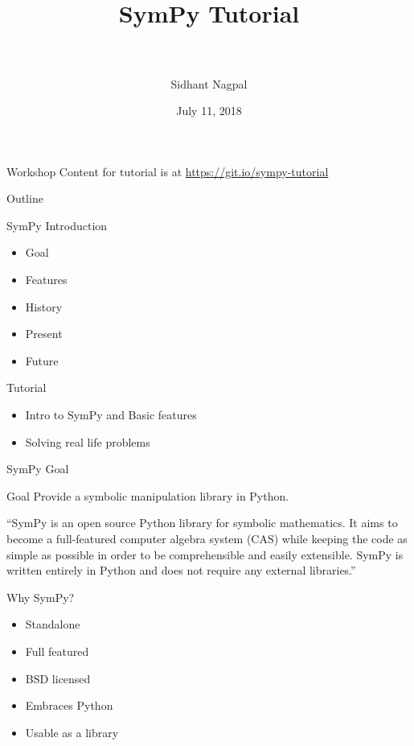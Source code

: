 \documentclass[xcolor=svgnames]{beamer}
\title[SymPy\hspace{4em}\insertframenumber/
\inserttotalframenumber]{~\\ SymPy Tutorial \\~}
\author[Sidhant Nagpal]
{Sidhant Nagpal}
\institute{\pgfuseimage{mylogo}}
\date{July 11, 2018}
\begin{document}
\begin{frame}
  \maketitle
\begin{center}
\normalsize Workshop Content for tutorial is at \url{https://git.io/sympy-tutorial}
\end{center}
\end{frame}

\begin{frame}{Outline}
  \begin{block}{SymPy Introduction}
    \begin{itemize}
    \item Goal
    \item Features
    \item History
    \item Present
    \item Future
    \end{itemize}
  \end{block}

  \begin{block}{Tutorial}
    \begin{itemize}
    \item Intro to SymPy and Basic features
    \item Solving real life problems
    \end{itemize}
  \end{block}
\end{frame}

\begin{frame}{SymPy Goal}
  \begin{block}{Goal}
    Provide a symbolic manipulation library in Python.
  \end{block}
  \pause
  \begin{block}

    ``SymPy is an open source Python library for symbolic mathematics. It aims to
    become a full-featured computer algebra system (CAS) while keeping the code as
    simple as possible in order to be comprehensible and easily extensible. SymPy
    is written entirely in Python and does not require any external libraries.''

  \end{block}
\end{frame}

\begin{frame}{Why SymPy?}
  \begin{block}{}
    \begin{itemize}
      \item Standalone
      \item Full featured
      \item BSD licensed
      \item Embraces Python
      \item Usable as a library
    \end{itemize}
  \end{block}
\end{frame}
\end{document}
